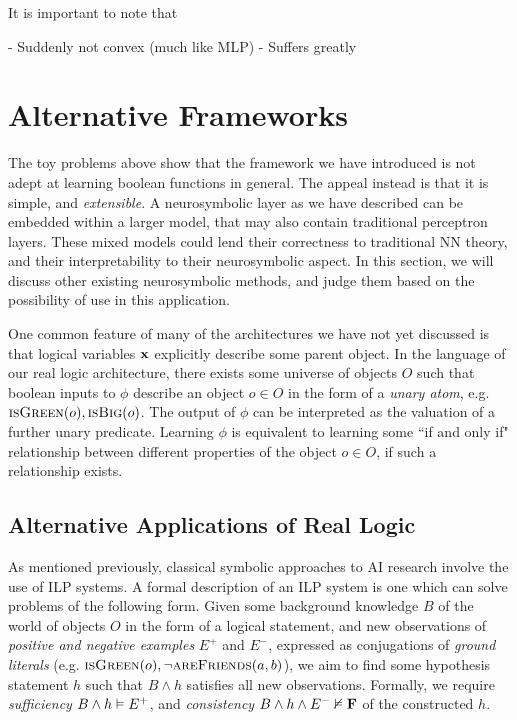 

It is important to note that 

- Suddenly not convex (much like MLP)
- Suffers greatly


\section{Alternative Frameworks}

The toy problems above show that the framework we have introduced is not adept at learning boolean functions in general. The appeal instead is that it is simple, and \textit{extensible}. A neurosymbolic layer as we have described can be embedded within a larger model, that may also contain traditional perceptron layers. These mixed models could lend their correctness to traditional NN theory, and their interpretability to their neurosymbolic aspect. In this section, we will discuss other existing neurosymbolic methods, and judge them based on the possibility of use in this application.

One common feature of many of the architectures we have not yet discussed is that logical variables $\mathbf{x}$ explicitly describe some parent object. In the language of our real logic architecture, there exists some universe of objects $O$ such that boolean inputs to $\phi$ describe an object $o \in O$ in the form of a \textit{unary atom}, e.g. $\textsc{isGreen}(o), \textsc{isBig}(o)$. The output of $\phi$ can be interpreted as the valuation of a further unary predicate. Learning $\phi$ is equivalent to learning some ``if and only if" relationship between different properties of the object $o\in O$, if such a relationship exists. 

\subsection{Alternative Applications of Real Logic}

As mentioned previously, classical symbolic approaches to AI research involve the use of ILP systems. A formal description of an ILP system is one which can solve problems of the following form. Given some background knowledge $B$ of the world of objects $O$ in the form of a logical statement, and new observations of \textit{positive and negative examples} $E^+$ and $E^-$, expressed as conjugations of \textit{ground literals} (e.g. $\textsc{isGreen}(o), \lnot \textsc{areFriends}(a,b)$), we aim to find some hypothesis statement $h$ such that $B \land h$ satisfies all new observations. Formally, we require \textit{sufficiency} $B \land h \vDash E^+$, and \textit{consistency} $B \land h \land E^- \nvDash \textbf{F}$ of the constructed $h$.

